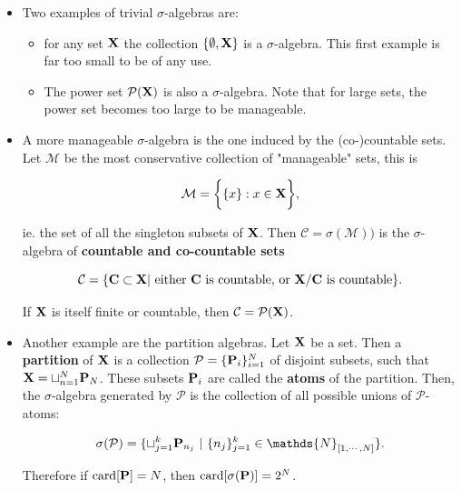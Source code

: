 \documentclass{homework}
\begin{document}
\begin{itemize}
    \item Two examples of trivial $\sigma$-algebras are:
    \begin{itemize}
        \item for any set ${\bf X}$ the collection $\{\emptyset, {\bf X}\}$ is a $\sigma$-algebra. This first example is far too small to be of any use.
        \item The power set $\mathcal{P}({\bf X})$ is also a $\sigma$-algebra. Note that for large sets, the power set becomes too large to be manageable.\\
    \end{itemize}
    
    \item A more manageable $\sigma$-algebra is the one induced by the (co-)countable sets. Let $\mathcal{M}$ be the most conservative collection of "manageable" sets, this is 
    
    $$
    \mathcal{M} = \bigg\{\{x\}: x \in {\bf X} \bigg\},
    $$
    
    ie. the set of all the singleton subsets of ${\bf X}$. Then $\mathcal{C} = \sigma(\mathcal{M}))$ is the $\sigma$-algebra of \textbf{countable and co-countable sets} 
    
    $$
    \mathcal{C} = \{{\bf C} \subset {\bf X} | \textnormal{ either } {\bf C} \textnormal{ is countable, or } {\bf X}/{\bf C} \textnormal{ is countable}\}.
    $$
    
    If ${\bf X}$ is itself finite or countable, then $\mathcal{C} = \mathcal{P}({\bf X})$. \\
    
    \item Another example are the partition algebras. Let ${\bf X}$ be a set. Then a \textbf{partition} of ${\bf X}$ is a collection $\mathcal{P} = \{{\bf P}_i\}_{i=1}^{N}$ of disjoint subsets, such that ${\bf X}= \sqcup_{n=1}^{N} {\bf P}_N$. These subsets ${\bf P}_i$ are called the \textbf{atoms} of the partition. Then, the $\sigma$-algebra generated by $\mathcal{P}$ is the collection of all possible unions of $\mathcal{P}$-atoms:
    
    $$
    \sigma(\mathcal{P}) = \{\sqcup_{j=1}^{k}{\bf P}_{n_j}\textnormal{ }|\textnormal{ } \{n_j\}_{j=1}^{k} \in \mathds{N}_{[1, \cdots, N]}\}.
    $$
    
    Therefore if $\textnormal{card}[{\bf P}] = N$, then $\textnormal{card}[\sigma({\bf P})] = 2^N$. \\
    

\end{itemize}
\end{document}

